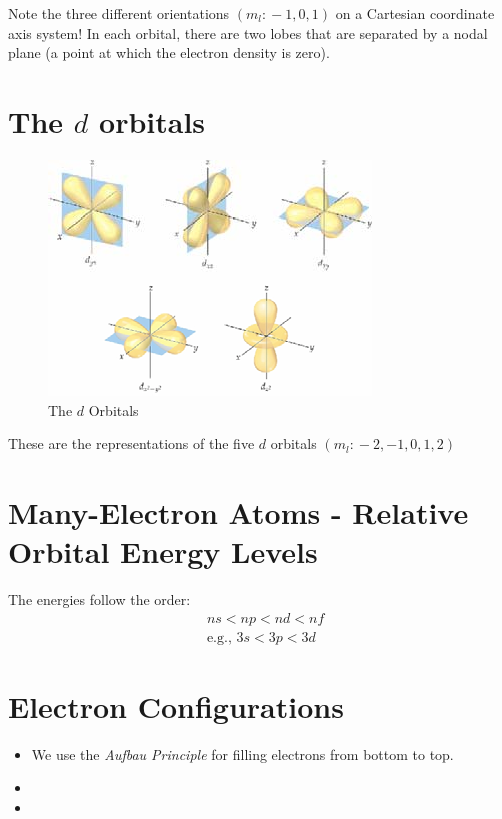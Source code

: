 \documentclass[
	chapter=7,
	title={Quantum Theory {\&} the Electronic Structure of Atoms},
	showanswers=true,
]{chem122notes}
\begin{document}
Note the three different orientations $(m_{l}:{ }-1, 0, 1)$ on a Cartesian coordinate axis system!
In each orbital, there are two lobes that are separated by a nodal plane (a point at which the electron density is zero).

\section{The $d$ orbitals}\label{sec:the-d-orbitals}
\begin{figure}[H]
	\centering
	\includegraphics[width=\textwidth]{chapter7/d-orbitals}
	\caption{The $d$ Orbitals}
	\label{fig:d-orbitals}
\end{figure}
These are the representations of the five $d$ orbitals $(m_{l}:{ }-2, -1, 0, 1, 2)$

\section{Many-Electron Atoms - Relative Orbital Energy Levels}\label{sec:many-electron-atoms---relative-orbital-energy-levels}
The energies follow the order:
\begin{equation*}
\begin{aligned}
	&ns < np < nd < nf\\
	&\mbox{e.g., } 3s < 3p < 3d
\end{aligned}
\end{equation*}

\section{Electron Configurations}\label{sec:electron-configurations}
\begin{itemize}
	\item We use the \emph{Aufbau Principle} for filling electrons from bottom to top.
	\item {}
	\item {}
\end{itemize}
\end{document}
